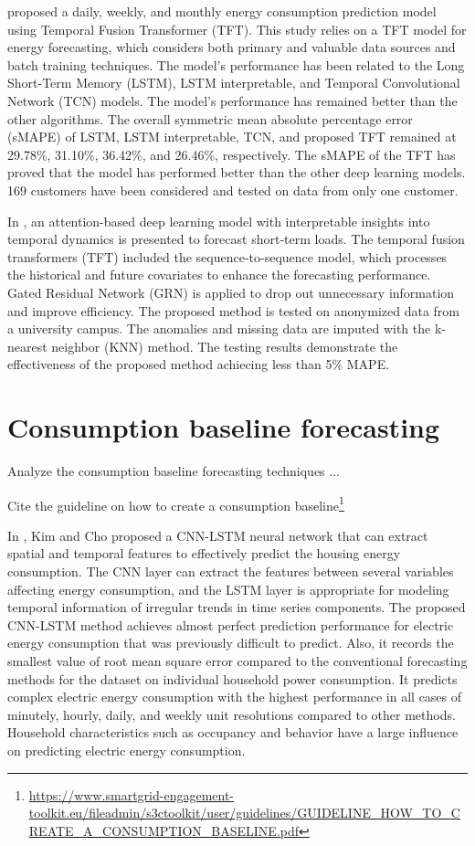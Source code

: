 \cite{NAZIR2023100888} proposed a daily, weekly, and monthly energy consumption prediction model using Temporal Fusion Transformer (TFT).
This study relies on a TFT model for energy forecasting, which considers both primary and valuable data sources and batch training techniques.
The model’s performance has been related to the Long Short-Term Memory (LSTM), LSTM interpretable, and Temporal Convolutional Network (TCN) models.
The model’s performance has remained better than the other algorithms.
The overall symmetric mean absolute percentage error (sMAPE) of LSTM, LSTM interpretable, TCN, and proposed TFT remained at 29.78\%, 31.10\%, 36.42\%, and 26.46\%, respectively.
The sMAPE of the TFT has proved that the model has performed better than the other deep learning models.
169 customers have been considered and tested on data from only one customer.

In \cite{10033079}, an attention-based deep learning model with interpretable insights into temporal dynamics is presented to forecast short-term loads.
The temporal fusion transformers (TFT) included the sequence-to-sequence model, which processes the historical and future covariates to enhance the forecasting performance.
Gated Residual Network (GRN) is applied to drop out unnecessary information and improve efficiency.
The proposed method is tested on anonymized data from a university campus.
The anomalies and missing data are imputed with the k-nearest neighbor (KNN) method.
The testing results demonstrate the effectiveness of the proposed method achiecing less than 5\% MAPE.


\section{Consumption baseline forecasting}
\label{sec:baselinesoa}
\vspace{0.2 cm}

Analyze the consumption baseline forecasting techniques ...

Cite the guideline on how to create a consumption baseline\footnote{ \url{https://www.smartgrid-engagement-toolkit.eu/fileadmin/s3ctoolkit/user/guidelines/GUIDELINE_HOW_TO_CREATE_A_CONSUMPTION_BASELINE.pdf} }

In \cite{KIM201972}, Kim and Cho proposed a CNN-LSTM neural network that can extract spatial and temporal features to effectively predict the housing energy consumption.
The CNN layer can extract the features between several variables affecting energy consumption, and the LSTM layer is appropriate for modeling temporal information of irregular trends in time series components. The proposed CNN-LSTM method achieves almost perfect prediction performance for electric energy consumption that was previously difficult to predict.
Also, it records the smallest value of root mean square error compared to the conventional forecasting methods for the dataset on individual household power consumption.
It predicts complex electric energy consumption with the highest performance in all cases of minutely, hourly, daily, and weekly unit resolutions compared to other methods.
Household characteristics such as occupancy and behavior have a large influence on predicting electric energy consumption.

